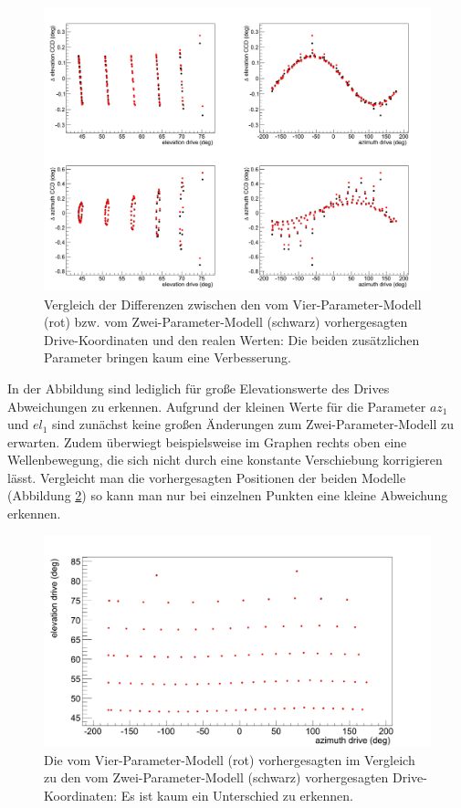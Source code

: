 \begin{figure}[htbp]
\centering
\includegraphics[width=\textwidth]{../341/C2D44comp.png}
\caption{Vergleich der Differenzen zwischen den vom Vier-Parameter-Modell (rot) bzw. vom Zwei-Parameter-Modell (schwarz) vorhergesagten Drive-Koordinaten und den realen Werten: Die beiden zusätzlichen Parameter bringen kaum eine Verbesserung.}
\label{img:C2D4comp}
\end{figure}
In der Abbildung sind lediglich für große Elevationswerte des Drives Abweichungen zu erkennen. Aufgrund der kleinen Werte für die Parameter $az_1$ und $el_1$ sind zunächst keine großen Änderungen zum Zwei-Parameter-Modell zu erwarten. Zudem überwiegt beispielsweise im Graphen rechts oben eine Wellenbewegung, die sich nicht durch eine konstante Verschiebung korrigieren lässt. Vergleicht man die vorhergesagten Positionen der beiden Modelle (Abbildung \ref{img:C2D4comp2}) so kann man nur bei einzelnen Punkten eine kleine Abweichung erkennen.
\begin{figure}[htbp]
\centering
\includegraphics[width=\textwidth]{../341/C2D44comp2.png}
\caption{Die vom Vier-Parameter-Modell (rot) vorhergesagten im Vergleich zu den vom Zwei-Parameter-Modell (schwarz) vorhergesagten Drive-Koordinaten: Es ist kaum ein Unterschied zu erkennen.}
\label{img:C2D4comp2}
\end{figure}

